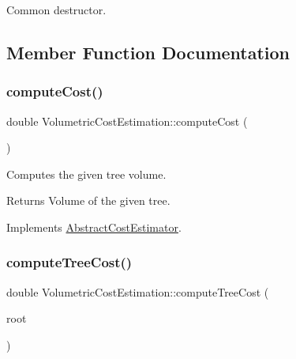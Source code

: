 Common destructor. 

\subsection{Member Function Documentation}
\mbox{\label{class_volumetric_cost_estimation_ae6aa420485924904c08759ef32810c04}} 
\subsubsection{\texorpdfstring{compute\+Cost()}{computeCost()}}
{\footnotesize\ttfamily double Volumetric\+Cost\+Estimation\+::compute\+Cost (\begin{DoxyParamCaption}{ }\end{DoxyParamCaption})\hspace{0.3cm}{\ttfamily [virtual]}}

Computes the given tree volume. \begin{DoxyReturn}{Returns}
Volume of the given tree. 
\end{DoxyReturn}


Implements \mbox{\hyperlink{class_abstract_cost_estimator_a3b6799768610ee84d4bce75bd2e6cdc8}{Abstract\+Cost\+Estimator}}.

\mbox{\label{class_volumetric_cost_estimation_a5082e98b1aad95975a56c828c1fdbf43}} 
\subsubsection{\texorpdfstring{compute\+Tree\+Cost()}{computeTreeCost()}}
{\footnotesize\ttfamily double Volumetric\+Cost\+Estimation\+::compute\+Tree\+Cost (\begin{DoxyParamCaption}\item[{\mbox{\hyperlink{class_abstract_vascular_element}{Abstract\+Vascular\+Element}} $\ast$}]{root }\end{DoxyParamCaption})\hspace{0.3cm}{\ttfamily [private]}}

